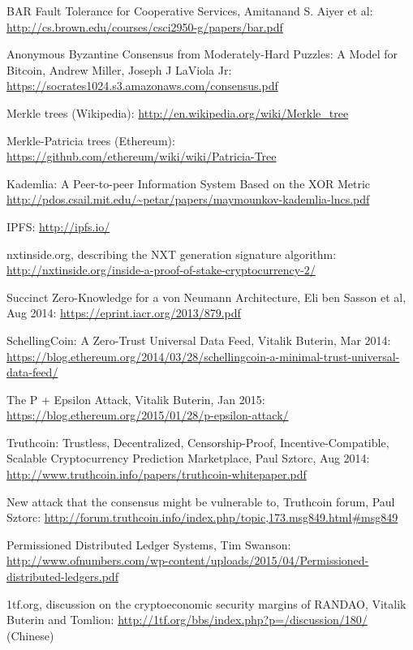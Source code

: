 \documentclass[11pt,a4paper]{article}
\theoremstyle{plain}
\theoremstyle{definition}
\theoremstyle{remark}
\begin{document}
\begin{thebibliography}{40}
    BAR Fault Tolerance for Cooperative Services, Amitanand S. Aiyer et al: \url{http://cs.brown.edu/courses/csci2950-g/papers/bar.pdf}

    Anonymous Byzantine Consensus from Moderately-Hard Puzzles: A Model for Bitcoin, Andrew Miller, Joseph J LaViola Jr: \url{https://socrates1024.s3.amazonaws.com/consensus.pdf}

    Merkle trees (Wikipedia): \url{http://en.wikipedia.org/wiki/Merkle_tree}

    Merkle-Patricia trees (Ethereum): \url{https://github.com/ethereum/wiki/wiki/Patricia-Tree}

    Kademlia: A Peer-to-peer Information System Based on the XOR Metric \url{http://pdos.csail.mit.edu/~petar/papers/maymounkov-kademlia-lncs.pdf}

    IPFS: \url{http://ipfs.io/}

    nxtinside.org, describing the NXT generation signature algorithm: \url{http://nxtinside.org/inside-a-proof-of-stake-cryptocurrency-2/}

    Succinct Zero-Knowledge for a von Neumann Architecture, Eli ben Sasson et al, Aug 2014: \url{https://eprint.iacr.org/2013/879.pdf}

    SchellingCoin: A Zero-Trust Universal Data Feed, Vitalik Buterin, Mar 2014: \url{https://blog.ethereum.org/2014/03/28/schellingcoin-a-minimal-trust-universal-data-feed/}

    The P + Epsilon Attack, Vitalik Buterin, Jan 2015: \url{https://blog.ethereum.org/2015/01/28/p-epsilon-attack/}

    Truthcoin: Trustless, Decentralized, Censorship-Proof, Incentive-Compatible, Scalable Cryptocurrency Prediction Marketplace, Paul Sztorc, Aug 2014: \url{http://www.truthcoin.info/papers/truthcoin-whitepaper.pdf}

    New attack that the consensus might be vulnerable to, Truthcoin forum, Paul Sztorc: \url{http://forum.truthcoin.info/index.php/topic,173.msg849.html#msg849}

    Permissioned Distributed Ledger Systems, Tim Swanson: \url{http://www.ofnumbers.com/wp-content/uploads/2015/04/Permissioned-distributed-ledgers.pdf}

    1tf.org, discussion on the cryptoeconomic security margins of RANDAO, Vitalik Buterin and Tomlion: \url{http://1tf.org/bbs/index.php?p=/discussion/180/} (Chinese)


\end{thebibliography}
\end{document}
